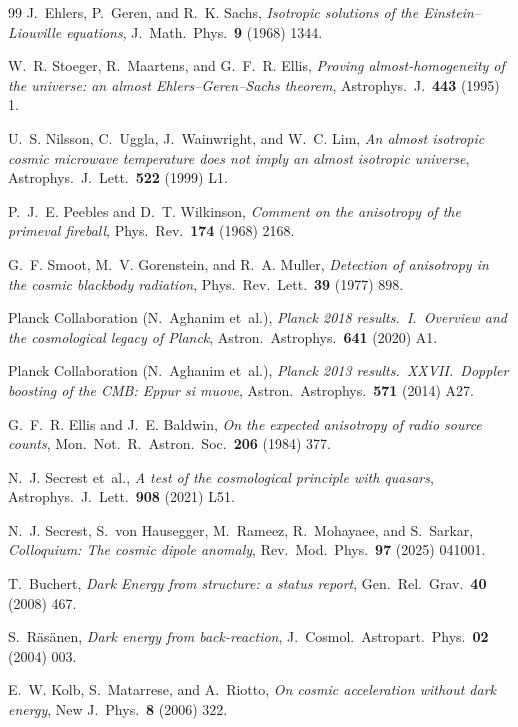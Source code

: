 \documentclass[11pt,a4paper]{article}
\begin{document}
\begin{thebibliography}{99}
J.~Ehlers, P.~Geren, and R.~K. Sachs,
\emph{Isotropic solutions of the Einstein--Liouville equations},
J.~Math.~Phys.~\textbf{9} (1968) 1344.

W.~R. Stoeger, R.~Maartens, and G.~F.~R. Ellis,
\emph{Proving almost-homogeneity of the universe: an almost Ehlers--Geren--Sachs theorem},
Astrophys.~J.~\textbf{443} (1995) 1.

U.~S. Nilsson, C.~Uggla, J.~Wainwright, and W.~C. Lim,
\emph{An almost isotropic cosmic microwave temperature does not imply an almost isotropic universe},
Astrophys.~J.~Lett.~\textbf{522} (1999) L1.

P.~J.~E. Peebles and D.~T. Wilkinson,
\emph{Comment on the anisotropy of the primeval fireball},
Phys.~Rev.~\textbf{174} (1968) 2168.

G.~F. Smoot, M.~V. Gorenstein, and R.~A. Muller,
\emph{Detection of anisotropy in the cosmic blackbody radiation},
Phys.~Rev.~Lett.~\textbf{39} (1977) 898.

Planck Collaboration (N.~Aghanim et~al.),
\emph{Planck 2018 results.~I.~Overview and the cosmological legacy of Planck},
Astron.~Astrophys.~\textbf{641} (2020) A1.

Planck Collaboration (N.~Aghanim et~al.),
\emph{Planck 2013 results.~XXVII.~Doppler boosting of the CMB: Eppur si muove},
Astron.~Astrophys.~\textbf{571} (2014) A27.

G.~F.~R. Ellis and J.~E. Baldwin,
\emph{On the expected anisotropy of radio source counts},
Mon.~Not.~R.~Astron.~Soc.~\textbf{206} (1984) 377.

N.~J. Secrest et~al.,
\emph{A test of the cosmological principle with quasars},
Astrophys.~J.~Lett.~\textbf{908} (2021) L51.

N.~J. Secrest, S.~von Hausegger, M.~Rameez, R.~Mohayaee, and S.~Sarkar,
\emph{Colloquium: The cosmic dipole anomaly},
Rev.~Mod.~Phys.~\textbf{97} (2025) 041001.

T.~Buchert,
\emph{Dark Energy from structure: a status report},
Gen.~Rel.~Grav.~\textbf{40} (2008) 467.

S.~R\"as\"anen,
\emph{Dark energy from back-reaction},
J.~Cosmol.~Astropart.~Phys.~\textbf{02} (2004) 003.

E.~W. Kolb, S.~Matarrese, and A.~Riotto,
\emph{On cosmic acceleration without dark energy},
New J.~Phys.~\textbf{8} (2006) 322.


\end{thebibliography}
\end{document}
